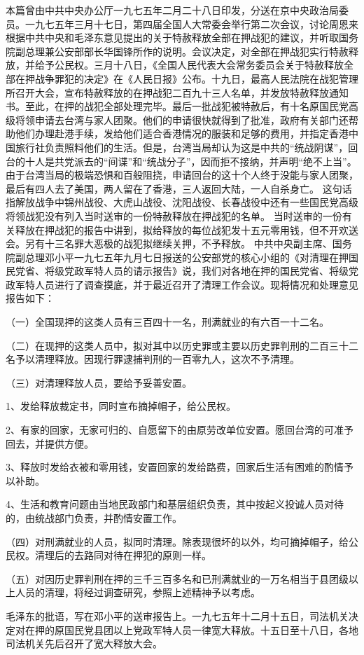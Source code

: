 \begin{maonote}
本篇曾由中共中央办公厅一九七五年二月二十八日印发，分送在京中央政治局委员。一九七五年三月十七日，第四届全国人大常委会举行第二次会议，讨论周恩来根据中共中央和毛泽东意见提出的关于特赦释放全部在押战犯的建议，并听取国务院副总理兼公安部部长华国锋所作的说明。会议决定，对全部在押战犯实行特赦释放，并给予公民权。三月十八日，《全国人民代表大会常务委员会关于特赦释放全部在押战争罪犯的决定》在《人民日报》公布。十九日，最高人民法院在战犯管理所召开大会，宣布特赦释放的在押战犯二百九十三人名单，并发放特赦释放通知书。至此，在押的战犯全部处理完毕。最后一批战犯被特赦后，有十名原国民党高级将领申请去台湾与家人团聚。他们的申请很快就得到了批准，政府有关部门还帮助他们办理赴港手续，发给他们适合香港情况的服装和足够的费用，并指定香港中国旅行社负责照料他们的生活。但是，台湾当局却认为这是中共的“统战阴谋”，回台的十人是共党派去的“间谍”和“统战分子”，因而拒不接纳，并声明“绝不上当”。由于台湾当局的极端恐惧和百般阻挠，申请回台的这十个人终于没能与家人团聚，最后有四人去了美国，两人留在了香港，三人返回大陆，一人自杀身亡。
这句话指解放战争中锦州战役、大虎山战役、沈阳战役、长春战役中还有一些国民党高级将领战犯没有列入当时送审的一份特赦释放在押战犯的名单。
当时送审的一份有关释放在押战犯的报告中讲到，拟给释放的每位战犯发十五元零用钱，但不开欢送会。另有十三名罪大恶极的战犯拟继续关押，不予释放。
中共中央副主席、国务院副总理邓小平一九七五年九月七日报送的公安部党的核心小组的《对清理在押国民党省、将级党政军特人员的请示报告》说，我们对各地在押的国民党省、将级党政军特人员进行了调查摸底，并于最近召开了清理工作会议。现将情况和处理意见报告如下：

（一）全国现押的这类人员有三百四十一名，刑满就业的有六百一十二名。

（二）在现押的这类人员中，拟对其中以历史罪或主要以历史罪判刑的二百三十二名予以清理释放。因现行罪逮捕判刑的一百零九人，这次不予清理。

（三）对清理释放人员，要给予妥善安置。

1、发给释放裁定书，同时宣布摘掉帽子，给公民权。

2、有家的回家，无家可归的、自愿留下的由原劳改单位安置。愿回台湾的可准予回去，并提供方便。

3、释放时发给衣被和零用钱，安置回家的发给路费，回家后生活有困难的酌情予以补助。

4、生活和教育问题由当地民政部门和基层组织负责，其中按起义投诚人员对待的，由统战部门负责，并酌情安置工作。

（四）对刑满就业的人员，拟同时清理。除表现很坏的以外，均可摘掉帽子，给公民权。清理后的去路同对待在押犯的原则一样。

（五）对因历史罪判刑在押的三千三百多名和已刑满就业的一万名相当于县团级以上人员的清理，将经过调查研究，参照上述精神予以考虑。

毛泽东的批语，写在邓小平的送审报告上。一九七五年十二月十五日，司法机关决定对在押的原国民党县团以上党政军特人员一律宽大释放。十五日至十八日，各地司法机关先后召开了宽大释放大会。
\end{maonote}

